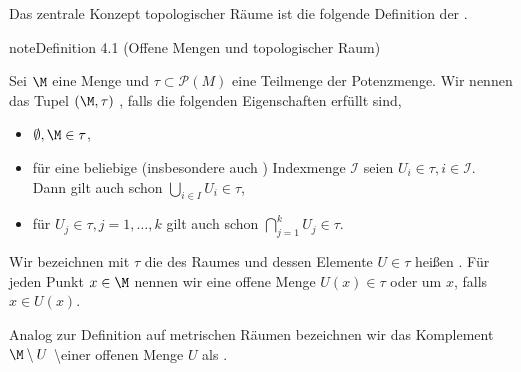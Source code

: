 \documentclass[letterpaper,10pt,english]{jupyterBook}
\begin{document}
\sphinxAtStartPar
Das zentrale Konzept topologischer Räume ist die folgende Definition der .
\label{manifolds/manifolds_prelim:definition-0}
\begin{sphinxadmonition}{note}{Definition 4.1 (Offene Mengen und topologischer Raum)}



\sphinxAtStartPar
Sei \(\M\) eine Menge und \(\tau \subset \mathcal{P}(M)\) eine Teilmenge der Potenzmenge.
Wir nennen das Tupel \((\M,\tau)\) , falls die folgenden Eigenschaften erfüllt sind,
\begin{itemize}
\item {} 
\sphinxAtStartPar
\(\emptyset, \M \in \tau\),

\item {} 
\sphinxAtStartPar
für eine beliebige (insbesondere auch ) Indexmenge \(\mathcal{I}\) seien \(U_i\in\tau, i\in \mathcal{I}\). Dann gilt auch schon \(\bigcup_{i\in I} U_i \in \tau\),

\item {} 
\sphinxAtStartPar
für  \(U_j\in\tau, j=1,\ldots, k\) gilt auch schon \(\bigcap_{j=1}^k U_j \in \tau\).

\end{itemize}

\sphinxAtStartPar
Wir bezeichnen mit \(\tau\) die  des Raumes und dessen Elemente \(U\in\tau\) heißen .
Für jeden Punkt \(x\in \M\) nennen wir eine offene Menge \(U(x) \in \tau\)  oder  um \(x\), falls \(x\in U(x)\).

\sphinxAtStartPar
Analog zur Definition auf metrischen Räumen bezeichnen wir das Komplement \(\M \setminus U\) \textbackslash{}einer offenen Menge \(U\) als .
\end{sphinxadmonition}
\end{document}
